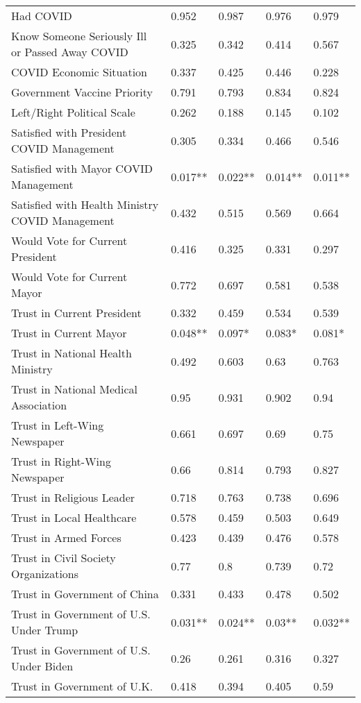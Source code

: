 \begin{table}[ht]
\begin{tabular}{lllll}
  Had COVID & 0.952 & 0.987 & 0.976 & 0.979 \\ 
  Know Someone Seriously Ill or Passed Away COVID & 0.325 & 0.342 & 0.414 & 0.567 \\ 
  COVID Economic Situation & 0.337 & 0.425 & 0.446 & 0.228 \\ 
  Government Vaccine Priority & 0.791 & 0.793 & 0.834 & 0.824 \\ 
  Left/Right Political Scale & 0.262 & 0.188 & 0.145 & 0.102 \\ 
  Satisfied with President COVID Management & 0.305 & 0.334 & 0.466 & 0.546 \\ 
  Satisfied with Mayor COVID Management & 0.017** & 0.022** & 0.014** & 0.011** \\ 
  Satisfied with Health Ministry COVID Management & 0.432 & 0.515 & 0.569 & 0.664 \\ 
  Would Vote for Current President & 0.416 & 0.325 & 0.331 & 0.297 \\ 
  Would Vote for Current Mayor & 0.772 & 0.697 & 0.581 & 0.538 \\ 
  Trust in Current President & 0.332 & 0.459 & 0.534 & 0.539 \\ 
  Trust in Current Mayor & 0.048** & 0.097* & 0.083* & 0.081* \\ 
  Trust in National Health Ministry & 0.492 & 0.603 & 0.63 & 0.763 \\ 
  Trust in National Medical Association & 0.95 & 0.931 & 0.902 & 0.94 \\ 
  Trust in Left-Wing Newspaper & 0.661 & 0.697 & 0.69 & 0.75 \\ 
  Trust in Right-Wing Newspaper & 0.66 & 0.814 & 0.793 & 0.827 \\ 
  Trust in Religious Leader & 0.718 & 0.763 & 0.738 & 0.696 \\ 
  Trust in Local Healthcare & 0.578 & 0.459 & 0.503 & 0.649 \\ 
  Trust in Armed Forces & 0.423 & 0.439 & 0.476 & 0.578 \\ 
  Trust in Civil Society Organizations & 0.77 & 0.8 & 0.739 & 0.72 \\ 
  Trust in Government of China & 0.331 & 0.433 & 0.478 & 0.502 \\ 
  Trust in Government of U.S. Under Trump & 0.031** & 0.024** & 0.03** & 0.032** \\ 
  Trust in Government of U.S. Under Biden & 0.26 & 0.261 & 0.316 & 0.327 \\ 
  Trust in Government of U.K. & 0.418 & 0.394 & 0.405 & 0.59 \\ 

\end{tabular}
\end{table}
